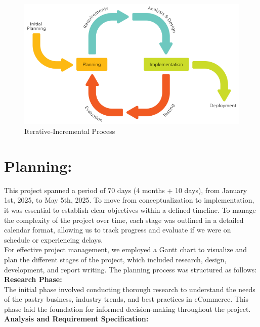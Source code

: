 \begin{figure}[!h]
\begin{center}
\includegraphics[width=15cm]{images/Iterative-Incremental process.png}
\end{center}
\caption{Iterative-Incremental Process}
\end{figure}


\section{Planning:}

This project spanned a period of 70 days (4 months + 10 days), from January 1st, 2025, to May 5th, 2025. To move from conceptualization to implementation, it was essential to establish clear objectives within a defined timeline. To manage the complexity of the project over time, each stage was outlined in a detailed calendar format, allowing us to track progress and evaluate if we were on schedule or experiencing delays.\\

For effective project management, we employed a Gantt chart to visualize and plan the different stages of the project, which included research, design, development, and report writing. The planning process was structured as follows:\\

\textbf{Research Phase:}\\

The initial phase involved conducting thorough research to understand the needs of the pastry business, industry trends, and best practices in eCommerce. This phase laid the foundation for informed decision-making throughout the project.\\

\textbf{Analysis and Requirement Specification:}\\

